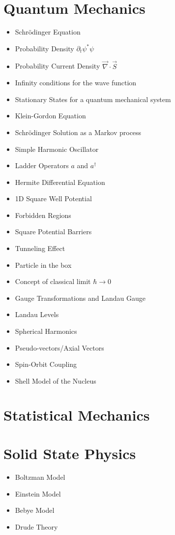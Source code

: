 \documentclass[10pt]{article}
\begin{document}
\section{Quantum Mechanics}
\begin{itemize}
	\item Schr\"odinger Equation
	\item Probability Density $\partial_t \psi^*\psi$
	\item Probability Current Density $\vec{\nabla}\cdot\vec{S}$
	\item Infinity conditions for the wave function
	\item Stationary States for a quantum mechanical system
	\item Klein-Gordon Equation
	\item Schr\"odinger Solution as a Markov process
	\item Simple Harmonic Oscillator
	\item Ladder Operators $a$ and $a^{\dag}$
	\item Hermite Differential Equation
	\item 1D Square Well Potential
	\item Forbidden Regions
	\item Square Potential Barriers
	\item Tunneling Effect
	\item Particle in the box
	\item Concept of classical limit $\hbar \to 0$
	\item Gauge Transformations and Landau Gauge
	\item Landau Levels
	\item Spherical Harmonics
	\item Pseudo-vectors/Axial Vectors
	\item Spin-Orbit Coupling
	\item Shell Model of the Nucleus
	\end{itemize}
\section{Statistical Mechanics}
\begin{refsection}
	\nocite{kittel1998thermal}
\printbibliography[heading=subbibliography]
\end{refsection}
\section{Solid State Physics}
\begin{itemize}
	\item Boltzman Model
	\item Einstein Model
	\item Bebye Model
	\item Drude Theory
\end{itemize}
\begin{refsection}
	\nocite{kittel2005introduction}
\printbibliography[heading=subbibliography]
\end{refsection}
\end{document}
